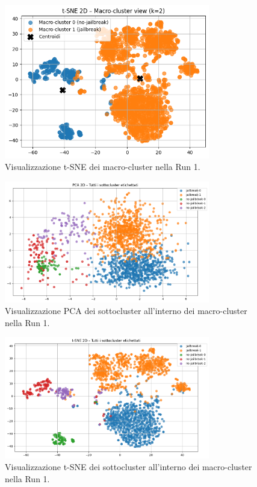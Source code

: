\documentclass[a4paper,12pt]{article}
\begin{document}
\begin{figure}[h]
    \centering
    \includegraphics[width=0.8\textwidth]{run1-tsne-tot.png}
    \caption{Visualizzazione t-SNE dei macro-cluster nella Run 1.}
    \label{fig:run1_tsne_tot}
\end{figure}

\begin{figure}[h]
    \centering
    \includegraphics[width=0.8\textwidth]{run1-pca-div.png}
    \caption{Visualizzazione PCA dei sottocluster all'interno dei macro-cluster nella Run 1.}
    \label{fig:run1_pca_div}
\end{figure}

\begin{figure}[h]
    \centering
    \includegraphics[width=0.8\textwidth]{run1-tsne-div.png}
    \caption{Visualizzazione t-SNE dei sottocluster all'interno dei macro-cluster nella Run 1.}
    \label{fig:run1_tsne_div}
\end{figure}
\end{document}
